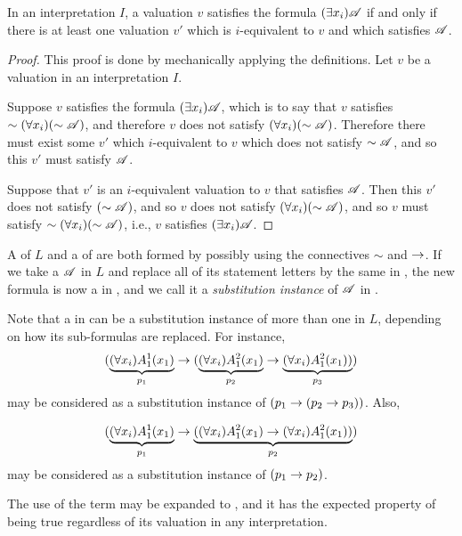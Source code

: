 \begin{proposition}
  In an interpretation \(I\), a valuation \(v\) satisfies the formula \((\exists x_i) \mathscr{A}\) if and only if there is at least one valuation \(v'\) which is \(i\)-equivalent to \(v\) and which satisfies \(\mathscr{A}\).

  \begin{proof}
    This proof is done by mechanically applying the definitions. Let \(v\) be a valuation in an interpretation \(I\).

    \Ra{} Suppose \(v\) satisfies the formula \((\exists x_i) \mathscr{A}\), which is to say that \(v\) satisfies \(\sim (\forall x_i) (\sim\mathscr{A})\), and therefore \(v\) does not satisfy \((\forall x_i) (\sim\mathscr{A})\). Therefore there must exist some \(v'\) which \(i\)-equivalent to \(v\) which does not satisfy \(\sim\mathscr{A}\), and so this \(v'\) must satisfy \(\mathscr{A}\).

    \La{} Suppose that \(v'\) is an \(i\)-equivalent valuation to \(v\) that satisfies \(\mathscr{A}\). Then this \(v'\) does not satisfy \((\sim\mathscr{A})\), and so \(v\) does not satisfy \((\forall x_i)(\sim\mathscr{A})\), and so \(v\) must satisfy \(\sim(\forall x_i)(\sim\mathscr{A})\), i.e., \(v\) satisfies \((\exists x_i)\mathscr{A}\). 
  \end{proof}
\end{proposition}

A \wf{} of \(L\) and a \wf{} of \cl{} are both formed by possibly using the connectives \(\sim\) and \(\rightarrow\). If we take a \wf{} \(\mathscr{A}\) in \(L\) and replace all of its statement letters by the same \wf{} in \cl{}, the new formula is now a \wf{} in \cl{}, and we call it a \textit{substitution instance} of \(\mathscr{A}\) in \cl{}.

Note that a \wf{} in \cl{} can be a substitution instance of more than one \wf{} in \(L\), depending on how its sub-formulas are replaced. For instance,
\[(\underbrace{(\forall x_i)A^1_1(x_1)}_{p_1} \rightarrow (\underbrace{(\forall x_i)A^2_1(x_1)}_{p_2} \rightarrow \underbrace{(\forall x_i)A^2_1(x_1))}_{p_3})\]
may be considered as a substitution instance of \((p_1 \rightarrow (p_2 \rightarrow p_3))\). Also,

\[(\underbrace{(\forall x_i)A^1_1(x_1)}_{p_1} \rightarrow \underbrace{((\forall x_i)A^2_1(x_1) \rightarrow (\forall x_i)A^2_1(x_1))}_{p_2})\]
may be considered as a substitution instance of \((p_1 \rightarrow p_2)\).

The use of the term  may be expanded to \cl{}, and it has the expected property of being true regardless of its valuation in any interpretation.

